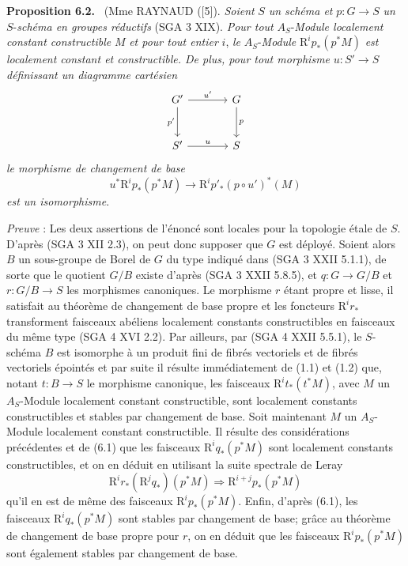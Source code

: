 \documentclass[11pt]{article}
\newenvironment{statement}[1]{\par\medskip\noindent\textbf{#1.}\ }{\par\medskip}
\begin{document}
\begin{statement}{Proposition 6.2}
(Mme RAYNAUD ([5]). \emph{Soient} $S$ \emph{un schéma et} $p:G\to S$ \emph{un} $S$-\emph{schéma en groupes réductifs} (SGA 3 XIX). \emph{Pour tout} $A_S$-\emph{Module localement constant constructible} $M$ \emph{et pour tout entier} $i$, \emph{le} $A_S$-\emph{Module} $\mathrm{R}^ip_*(p^*M)$ \emph{est localement constant et constructible. De plus, pour tout morphisme} $u:S'\to S$ \emph{définissant un diagramme cartésien}
\[
\begin{tikzcd}[column sep=large,row sep=large]
G' \arrow[r,"u'"] \arrow[d,"p'"'] & G \arrow[d,"p"]\\
S' \arrow[r,"u"] & S
\end{tikzcd}
\]
\emph{le morphisme de changement de base}
\[
u^*\mathrm{R}^ip_*(p^*M)\to \mathrm{R}^ip'_*(p\circ u')^*(M)
\]
\emph{est un isomorphisme}.
\end{statement}

\emph{Preuve} : Les deux assertions de l'énoncé sont locales pour la topologie étale de $S$. D'après (SGA 3 XII 2.3), on peut donc supposer que $G$ est déployé. Soient alors $B$ un sous-groupe de Borel de $G$ du type indiqué dans (SGA 3 XXII 5.1.1), de sorte que le quotient $G/B$ existe d'après (SGA 3 XXII 5.8.5), et $q:G\to G/B$ et $r:G/B\to S$ les morphismes canoniques. Le morphisme $r$ étant propre et lisse, il satisfait au théorème de changement de base propre et les foncteurs $\mathrm{R}^ir_*$ transforment faisceaux abéliens localement constants constructibles en faisceaux du même type (SGA 4 XVI 2.2). Par ailleurs, par (SGA 4 XXII 5.5.1), le $S$-schéma $B$ est isomorphe à un produit fini de fibrés vectoriels et de fibrés vectoriels épointés et par
suite il résulte immédiatement de (1.1) et (1.2) que, notant $t:B\to S$ le morphisme canonique, les 
faisceaux $\mathrm{R}^it_*(t^*M)$, avec $M$ un $A_S$-Module localement constant constructible, sont localement constants constructibles et stables par changement de base. Soit maintenant $M$ un $A_S$-Module localement constant constructible. Il résulte des considérations précédentes et de (6.1) que les faisceaux $\mathrm{R}^iq_*(p^*M)$ sont localement constants constructibles, et on en déduit en utilisant la suite spectrale de Leray
\[
\mathrm{R}^ir_*(\mathrm{R}^jq_*)(p^*M)\Rightarrow \mathrm{R}^{i+j}p_*(p^*M)
\]
qu'il en est de même des faisceaux $\mathrm{R}^ip_*(p^*M)$. Enfin, d'après (6.1), les faisceaux $\mathrm{R}^iq_*(p^*M)$ sont stables par changement de base; grâce au théorème de changement de base propre pour $r$, on en déduit que les faisceaux $\mathrm{R}^ip_*(p^*M)$ sont également stables par changement de base.
\end{document}
